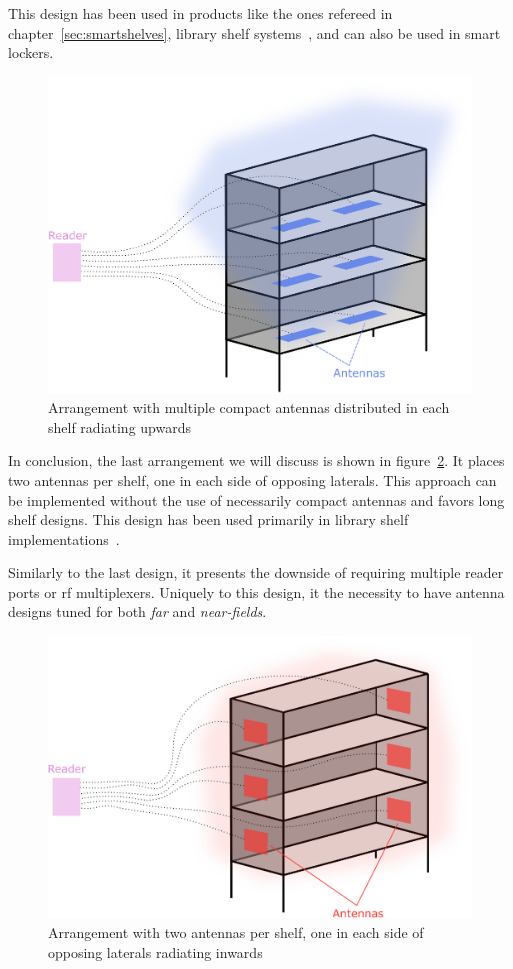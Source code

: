 This design has been used in products like the ones refereed in chapter~\ref{sec:smartshelves}, library shelf systems~\cite{markakisSafeEfficientDesign2014}, and can also be used in smart lockers.

\begin{figure}[H]
    \centering
    \includegraphics[width=0.6\linewidth]{./figs/02-state-of-the-art/position2_1.eps}
    \caption{Arrangement with multiple compact antennas distributed in each shelf radiating upwards} 
    \label{fig:position2}
\end{figure}

In conclusion, the last arrangement we will discuss is shown in figure~\ref{fig:position3}. It places two antennas per shelf, one in each side of opposing laterals. This approach can be implemented without the use of necessarily compact antennas and favors long shelf designs.
This design has been used primarily in library shelf implementations~\cite{markakisRFIDenabledLibraryManagement2013}.

Similarly to the last design, it presents the downside of requiring multiple reader ports or \ac{rf} multiplexers. Uniquely to this design, it the necessity to have antenna designs tuned for both \emph{far} and \emph{near-fields}.

\begin{figure}[H]
    \centering
    \includegraphics[width=0.6\linewidth]{./figs/02-state-of-the-art/position3.eps}
    \caption{Arrangement with two antennas per shelf, one in each side of opposing laterals radiating inwards} 
    \label{fig:position3}
\end{figure}

